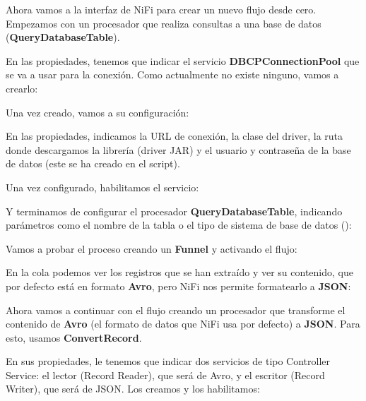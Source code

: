 \documentclass{../../miPlantilla}
\begin{document}
Ahora vamos a la interfaz de NiFi para crear un nuevo flujo desde cero. Empezamos con un procesador que realiza consultas a una base de datos (\textbf{QueryDatabaseTable}).


\newpage

En las propiedades, tenemos que indicar el servicio \textbf{DBCPConnectionPool} que se va a usar para la conexión. Como actualmente no existe ninguno, vamos a crearlo:


Una vez creado, vamos a su configuración:


En las propiedades, indicamos la URL de conexión, la clase del driver, la ruta donde descargamos la librería (driver JAR) y el usuario y contraseña de la base de datos (este se ha creado en el script).


Una vez configurado, habilitamos el servicio:


Y terminamos de configurar el procesador \textbf{QueryDatabaseTable}, indicando parámetros como el nombre de la tabla o el tipo de sistema de base de datos ():


\newpage

Vamos a probar el proceso creando un \textbf{Funnel} y activando el flujo:


En la cola podemos ver los registros que se han extraído y ver su contenido, que por defecto está en formato \textbf{Avro}, pero NiFi nos permite formatearlo a \textbf{JSON}:


\newpage

Ahora vamos a continuar con el flujo creando un procesador que transforme el contenido de \textbf{Avro} (el formato de datos que NiFi usa por defecto) a \textbf{JSON}. Para esto, usamos \textbf{ConvertRecord}.


En sus propiedades, le tenemos que indicar dos servicios de tipo Controller Service: el lector (Record Reader), que será de Avro, y el escritor (Record Writer), que será de JSON. Los creamos y los habilitamos:
\end{document}
